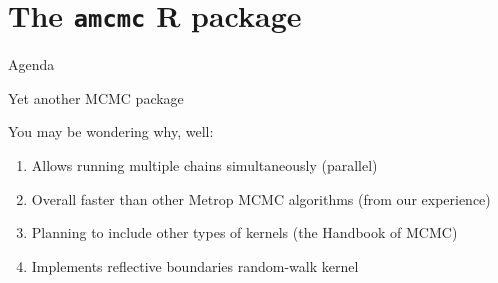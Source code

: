 \documentclass[9pt,ignorenonframetext,]{beamer}
\begin{document}
\section{\texorpdfstring{The \texttt{amcmc} R
package}{The amcmc R package}}\label{the-amcmc-r-package}

\begin{frame}[t]{Agenda}

\tableofcontents[currentsection]

\end{frame}

\begin{frame}{Yet another MCMC package}

You may be wondering why, well:

\begin{enumerate}
\def\labelenumi{\arabic{enumi}.}
\item
  Allows running multiple chains simultaneously (parallel)
\item
  Overall faster than other Metrop MCMC algorithms (from our experience)
\item
  Planning to include other types of kernels (the Handbook of MCMC)
\item
  Implements reflective boundaries random-walk kernel
\end{enumerate}

\end{frame}
\end{document}

